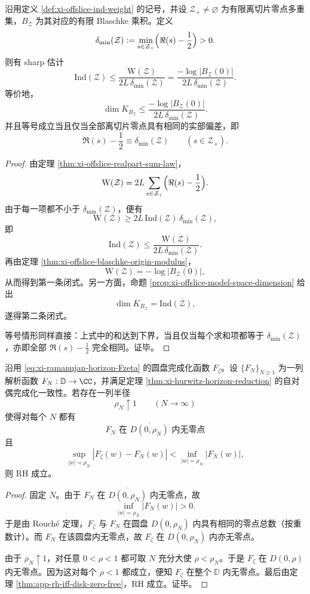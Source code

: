\begin{theorem}\label{thm:xi-time-part65e-blaschke-origin-modulus-dimension-bound}
沿用定义 \ref{def:xi-offslice-ind-weight} 的记号，并设 \(\mathcal Z_{+}\neq\varnothing\) 为有限离切片零点多重集，\(B_{\mathcal Z}\) 为其对应的有限 Blaschke 乘积。定义
\[
\delta_{\min}(\mathcal Z)
:=
\min_{s\in\mathcal Z_{+}}
\Bigl(\Re(s)-\frac12\Bigr)
>0.
\]
则有 sharp 估计
\[
\mathrm{Ind}(\mathcal Z)
\le
\frac{\mathrm W(\mathcal Z)}{2L\,\delta_{\min}(\mathcal Z)}
=
\frac{-\log|B_{\mathcal Z}(0)|}{2L\,\delta_{\min}(\mathcal Z)}.
\]
等价地，
\[
\dim K_{B_{\mathcal Z}}
\le
\frac{-\log|B_{\mathcal Z}(0)|}{2L\,\delta_{\min}(\mathcal Z)}.
\]
并且等号成立当且仅当全部离切片零点具有相同的实部偏差，即
\[
\Re(s)-\frac12\equiv \delta_{\min}(\mathcal Z)
\qquad(s\in\mathcal Z_{+}).
\]
\end{theorem}
\begin{proof}
由定理 \ref{thm:xi-offslice-realpart-sum-law}，
\[
\mathrm W(\mathcal Z)
=
2L\sum_{s\in\mathcal Z_{+}}
\Bigl(\Re(s)-\frac12\Bigr).
\]
由于每一项都不小于 \(\delta_{\min}(\mathcal Z)\)，便有
\[
\mathrm W(\mathcal Z)\ge 2L\,\mathrm{Ind}(\mathcal Z)\,\delta_{\min}(\mathcal Z),
\]
即
\[
\mathrm{Ind}(\mathcal Z)
\le
\frac{\mathrm W(\mathcal Z)}{2L\,\delta_{\min}(\mathcal Z)}.
\]
再由定理 \ref{thm:xi-offslice-blaschke-origin-modulus}，
\[
\mathrm W(\mathcal Z)=-\log|B_{\mathcal Z}(0)|,
\]
从而得到第一条闭式。另一方面，命题 \ref{prop:xi-offslice-model-space-dimension} 给出
\[
\dim K_{B_{\mathcal Z}}=\mathrm{Ind}(\mathcal Z),
\]
遂得第二条闭式。

等号情形同样直接：上式中的和达到下界，当且仅当每个求和项都等于 \(\delta_{\min}(\mathcal Z)\)，亦即全部 \(\Re(s)-\tfrac12\) 完全相同。证毕。
\end{proof}

\begin{theorem}\label{thm:xi-time-part65e-rouche-boundary-margin-rh-certificate}
沿用 \eqref{eq:xi-ramanujan-horizon-Fzeta} 的圆盘完成化函数 \(F_{\zeta}\)。设 \(\{F_N\}_{N\ge 1}\) 为一列解析函数 \(F_N:\mathbb{D}\to\CC\)，并满足定理 \ref{thm:xi-hurwitz-horizon-reduction} 的自对偶完成化一致性。若存在一列半径
\[
\rho_N\uparrow 1
\qquad(N\to\infty)
\]
使得对每个 \(N\) 都有
\[
F_N\text{ 在 }\overline{D(0,\rho_N)}\text{ 内无零点}
\]
且
\[
\sup_{|w|=\rho_N}|F_{\zeta}(w)-F_N(w)|
<
\inf_{|w|=\rho_N}|F_N(w)|,
\]
则 RH 成立。
\end{theorem}
\begin{proof}
固定 \(N\)。由于 \(F_N\) 在 \(\overline{D(0,\rho_N)}\) 内无零点，故
\[
\inf_{|w|=\rho_N}|F_N(w)|>0.
\]
于是由 Rouch\'e 定理，\(F_{\zeta}\) 与 \(F_N\) 在圆盘 \(D(0,\rho_N)\) 内具有相同的零点总数（按重数计）。而 \(F_N\) 在该圆盘内无零点，故 \(F_{\zeta}\) 在 \(D(0,\rho_N)\) 内亦无零点。

由于 \(\rho_N\uparrow 1\)，对任意 \(0<\rho<1\) 都可取 \(N\) 充分大使 \(\rho<\rho_N\)。于是 \(F_{\zeta}\) 在 \(D(0,\rho)\) 内无零点。因为这对每个 \(\rho<1\) 都成立，便知 \(F_{\zeta}\) 在整个 \(\mathbb D\) 内无零点。最后由定理 \ref{thm:app-rh-iff-disk-zero-free}，RH 成立。证毕。
\end{proof}

